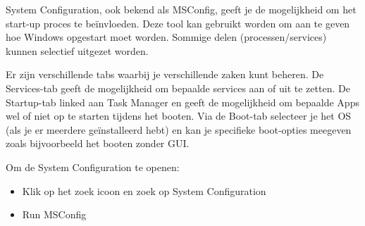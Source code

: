 System Configuration, ook bekend als MSConfig, geeft je de mogelijkheid om het start-up proces te be\"invloeden. Deze tool kan gebruikt worden om aan te geven hoe Windows opgestart moet worden. Sommige delen (processen/services) kunnen selectief uitgezet worden.

Er zijn verschillende tabs waarbij je verschillende zaken kunt beheren. De Services-tab geeft de mogelijkheid om bepaalde services aan of uit te zetten. De Startup-tab linked aan Task Manager en geeft de mogelijkheid om bepaalde Apps wel of niet op te starten tijdens het booten. Via de Boot-tab selecteer je het OS (als je er meerdere ge\"installeerd hebt) en kan je specifieke boot-opties meegeven zoals bijvoorbeeld het booten zonder GUI.

Om de System Configuration te openen:
\begin{itemize}
\item Klik op het zoek icoon en zoek op System Configuration
\item Run MSConfig
\end{itemize}

\begin{minipage}[t]{\linewidth}
\raggedright
{}
\end{minipage}

